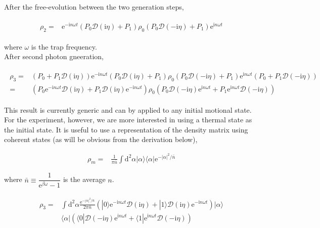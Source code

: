 \documentclass[10pt,fleqn]{article}
\newcommand{\ud}{\mathrm{d}}
\newcommand{\ue}{\mathrm{e}}
\newcommand{\ui}{\mathrm{i}}
\newcommand{\eqar}[1]
{
  \begin{align}
    #1
  \end{align}
}
\newcommand{\paren}[1]{{\left({#1}\right)}}
\newcommand{\abs}[1]{{\left|{#1}\right|}}
\begin{document}
After the free-evolution between the two generation steps,
\eqar{
  \begin{split}
    \rho_2=&\ue^{-\ui n\omega t}\paren{P_{0}\mathcal{D}(\ui\eta)+P_{1}}\rho_0\paren{P_{0}\mathcal{D}(-\ui\eta)+P_{1}}\ue^{\ui n\omega t}
  \end{split}
}
where $\omega$ is the trap frequency.\\

After second photon gneeration,
\eqar{
  \begin{split}
    \rho_3=&\paren{P_{0}+P_{1}\mathcal{D}(\ui\eta)}\ue^{-\ui n\omega t}\paren{P_{0}\mathcal{D}(\ui\eta)+P_{1}}\rho_0\paren{P_{0}\mathcal{D}(-\ui\eta)+P_{1}}\ue^{\ui n\omega t}\paren{P_{0}+P_{1}\mathcal{D}(-\ui\eta)}\\
    =&\paren{P_{0}\ue^{-\ui n\omega t}\mathcal{D}(\ui\eta)+P_{1}\mathcal{D}(\ui\eta)\ue^{-\ui n\omega t}}\rho_0\paren{P_{0}\mathcal{D}(-\ui\eta)\ue^{\ui n\omega t}+P_{1}\ue^{\ui n\omega t}\mathcal{D}(-\ui\eta)}
  \end{split}
}
This result is currently generic and can by applied to any initial motional state.
For the experiment, however, we are more interested in using a thermal state
as the initial state. It is useful to use a representation of the density matrix
using coherent states (as will be obvious from the derivation below),

\eqar{
  \rho_m=&\frac{1}{\pi {\bar n}}\int\ud^2\alpha |\alpha\rangle\langle\alpha|\ue^{-\abs{\alpha}^2/{\bar n}}
}
where ${\bar n}\equiv\dfrac{1}{\ue^{\beta\omega}-1}$ is the average $n$.

\eqar{
  \begin{split}
    \rho_3=
    &\int\ud^2\alpha \frac{\ue^{-\abs{\alpha}^2/{\bar n}}}{2\pi {\bar n}}
      \paren{|0\rangle\ue^{-\ui n\omega t}\mathcal{D}(\ui\eta)+|1\rangle\mathcal{D}(\ui\eta)\ue^{-\ui n\omega t}}|\alpha\rangle\\
    &\langle\alpha|\paren{\langle0|\mathcal{D}(-\ui\eta)\ue^{\ui n\omega t}+\langle1|\ue^{\ui n\omega t}\mathcal{D}(-\ui\eta)}
  \end{split}
}
\end{document}
